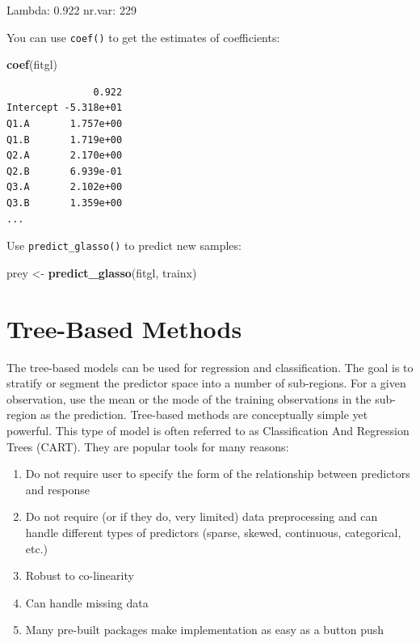 \documentclass[12pt,]{krantz}
\makeatletter
\newenvironment{Shaded}{\begin{snugshade}}{\end{snugshade}}
\newcommand{\KeywordTok}[1]{\textcolor[rgb]{0.27,0.27,0.27}{\textbf{#1}}}
\newcommand{\NormalTok}[1]{#1}
\newcommand{\StringTok}[1]{\textcolor[rgb]{0.5,0.5,0.5}{#1}}
\providecommand{\tightlist}{%
  \setlength{\itemsep}{0pt}\setlength{\parskip}{0pt}}
\newenvironment{kframe}{%
\medskip{}
\setlength{\fboxsep}{.8em}
 \def\at@end@of@kframe{}%
 \ifinner\ifhmode%
  \def\at@end@of@kframe{\end{minipage}}%
  \begin{minipage}{\columnwidth}%
 \fi\fi%
 \def\FrameCommand##1{\hskip\@totalleftmargin \hskip-\fboxsep
 \colorbox{shadecolor}{##1}\hskip-\fboxsep
     \hskip-\linewidth \hskip-\@totalleftmargin \hskip\columnwidth}%
 \MakeFramed {\advance\hsize-\width
   \@totalleftmargin\z@ \linewidth\hsize
   \@setminipage}}%
 {\par\unskip\endMakeFramed%
 \at@end@of@kframe}
\renewenvironment{Shaded}{\begin{kframe}}{\end{kframe}}
\makeatother
\begin{document}
\begin{Shaded}
\begin{Highlighting}[]
\NormalTok{Lambda: 0.922  nr.var: 229}
\end{Highlighting}
\end{Shaded}

You can use \texttt{coef()} to get the estimates of coefficients:

\begin{Shaded}
\begin{Highlighting}[]
\KeywordTok{coef}\NormalTok{(fitgl)}
\end{Highlighting}
\end{Shaded}

\begin{verbatim}
               0.922
Intercept -5.318e+01
Q1.A       1.757e+00
Q1.B       1.719e+00
Q2.A       2.170e+00
Q2.B       6.939e-01
Q3.A       2.102e+00
Q3.B       1.359e+00
...
\end{verbatim}

Use \texttt{predict\_glasso()} to predict new samples:

\begin{Shaded}
\begin{Highlighting}[]
\NormalTok{prey <-}\StringTok{ }\KeywordTok{predict_glasso}\NormalTok{(fitgl, trainx)}
\end{Highlighting}
\end{Shaded}

\hypertarget{treemodel}{%
\chapter{Tree-Based Methods}\label{treemodel}}

The tree-based models can be used for regression and classification. The goal is to stratify or segment the predictor space into a number of sub-regions. For a given observation, use the mean or the mode of the training observations in the sub-region as the prediction. Tree-based methods are conceptually simple yet powerful. This type of model is often referred to as Classification And Regression Trees (CART). They are popular tools for many reasons:

\begin{enumerate}
\def\labelenumi{\arabic{enumi}.}
\tightlist
\item
  Do not require user to specify the form of the relationship between predictors and response
\item
  Do not require (or if they do, very limited) data preprocessing and can handle different types of predictors (sparse, skewed, continuous, categorical, etc.)
\item
  Robust to co-linearity
\item
  Can handle missing data
\item
  Many pre-built packages make implementation as easy as a button push
\end{enumerate}
\end{document}
